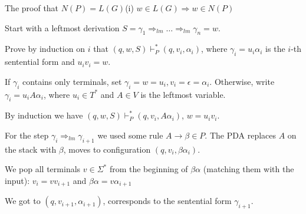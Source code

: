 \documentclass[handout]{beamer}
\begin{document}
\begin{frame}{The proof that $N(P)=L(G)$\hfill \alert{(i) $w\in L(G)\Rightarrow w\in N(P)$}}

    Start with a leftmost derivation $S=\gamma_1\Rightarrow_{lm}\ldots\Rightarrow_{lm}\gamma_n=w$.

    Prove by induction on $i$ that $(q,w,S)\vdash_P^* (q, v_i,\alpha_i)$, where $\gamma_i=u_i\alpha_i$ is the $i$-th sentential form and $u_iv_i=w$.

    If $\gamma_i$ contains only terminals, set $\gamma_i=w=u_i, v_i=\epsilon=\alpha_i$. Otherwise, write $\gamma_i=u_iA\alpha_i$, where $u_i\in T^*$ and $A\in V$ is the leftmost variable.

    By induction we have $(q,w,S)\vdash_P^* (q, v_i,A\alpha_i)$, $w=u_iv_i$.

    For the step $\gamma_i\Rightarrow_{lm}\gamma_{i+1}$ we used some rule $A\rightarrow\beta\in P$. The PDA replaces $A$ on the stack with $\beta$, moves to configuration $(q,v_i,\beta\alpha_i)$.

    We pop all terminals $v\in \Sigma^*$ from the beginning of $\beta\alpha$ (matching them with the input): $v_i=vv_{i+1}$ and $\beta\alpha=v\alpha_{i+1}$

    We got to $(q,v_{i+1},\alpha_{i+1})$, corresponds to the sentential form $\gamma_{i+1}$.
    
\end{frame}
\end{document}
